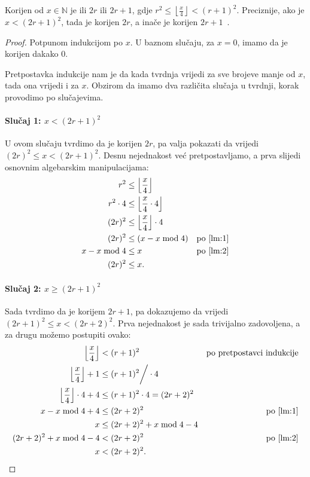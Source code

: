 \documentclass[12pt]{scrartcl}
\begin{document}
\begin{teorem}\label{tm:isqrt1}
    Korijen od $x\in\mathbb N$ je ili $2r$ ili $2r+1$, gdje $r^2\leq\left\lfloor\frac{x}{4}\right\rfloor < (r+1)^2$. Preciznije,
    ako je $x < (2r+1)^2$, tada je korijen $2r$, a inače je korijen $2r+1$~\cite{sqrtproof}.
\end{teorem}
\begin{proof}
    Potpunom indukcijom po $x$. U baznom slučaju, za $x=0$, imamo da je korijen dakako $0$.

    Pretpostavka indukcije nam je da kada tvrdnja vrijedi za sve brojeve manje od $x$, tada ona vrijedi i za $x$.
    Obzirom da imamo dva različita slučaja u tvrdnji, korak provodimo po slučajevima.
    \paragraph{Slučaj 1: $x<(2r+1)^2$}
    
    U ovom slučaju tvrdimo da je korijen $2r$, pa valja pokazati da vrijedi $(2r)^2\leq x < (2r+1)^2$. Desnu nejednakost već pretpostavljamo,
    a prva slijedi osnovnim algebarskim manipulacijama:
    \begin{align*}
        r^2 &\leq \left\lfloor\frac{x}{4}\right\rfloor &\\
        r^2\cdot 4 &\leq \left\lfloor\frac{x}{4}\cdot 4\right\rfloor &\\
        (2r)^2 &\leq \left\lfloor\frac{x}{4}\right\rfloor\cdot 4 &\\
        (2r)^2 &\leq (x - x \bmod 4) & \text{po \eqref{lm:1}}\\
        x - x \bmod 4 &\leq x & \text{po \eqref{lm:2}}\\
        (2r)^2 &\leq  x\text.&
    \end{align*} %

    \paragraph{Slučaj 2: $x \geq (2r+1)^2$}

    Sada tvrdimo da je korijem $2r+1$, pa dokazujemo da vrijedi $(2r+1)^2 \leq x < (2r+2)^2$. Prva nejednakost je sada trivijalno zadovoljena,
    a za drugu možemo postupiti ovako:
    \begin{align*}
        \left\lfloor\frac{x}{4}\right\rfloor &< (r+1)^2 & \text{po pretpostavci indukcije}\\
        \left\lfloor\frac{x}{4}\right\rfloor + 1 &\leq (r+1)^2 \bigg/\cdot 4 &\\
        \left\lfloor\frac{x}{4}\right\rfloor\cdot 4 + 4 &\leq (r+1)^2\cdot 4 = (2r+2)^2 &\\
        x - x \bmod 4 + 4 &\leq (2r+2)^2 & \text{po \eqref{lm:1}}\\
        x &\leq (2r+2)^2 + x \bmod 4 - 4 &\\
        (2r+2)^2 + x \bmod 4 - 4 &< (2r+2)^2 & \text{po \eqref{lm:2}}\\
        x &< (2r+2)^2\text.&
    \end{align*}
\end{proof}
\end{document}
